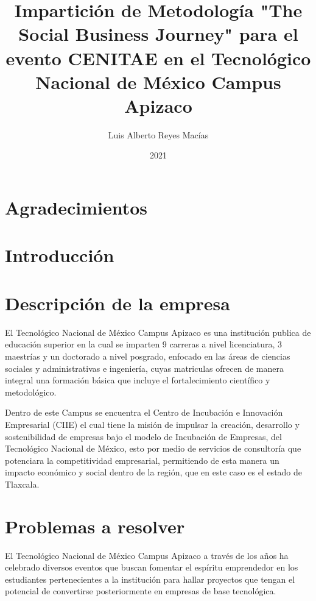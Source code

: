 \documentclass{memoir}
\title{Impartici\'on de Metodolog\'ia "The Social Business Journey" para el evento CENITAE en el Tecnol\'ogico Nacional de M\'exico Campus Apizaco}
\author{Luis Alberto Reyes Mac\'ias}
\date{2021}
\begin{document}
\maketitle

\chapter{Agradecimientos}

\clearpage

\begin{abstract}

\end{abstract}

\clearpage

\tableofcontents

\clearpage


\chapter{Introducción}
\label{sec:org3482cf4}


\chapter{Descripción de la empresa}
\label{sec:orgac75187}

El Tecnológico Nacional de México Campus Apizaco es una institución publica de educación superior en la cual se imparten 9 carreras a nivel licenciatura, 3 maestrías y un doctorado a nivel posgrado, enfocado en las áreas de ciencias sociales y administrativas e ingeniería, cuyas matriculas ofrecen de manera integral una formación básica que incluye el fortalecimiento científico y metodológico. 

Dentro de este Campus se encuentra el Centro de Incubación e Innovación Empresarial (CIIE) el cual tiene la misión de impulsar la creación, desarrollo y sostenibilidad de empresas bajo el modelo de Incubación de Empresas, del Tecnológico Nacional de México, esto por medio de servicios de consultoría que potenciara la competitividad empresarial, permitiendo de esta manera un impacto económico y social dentro de la región, que en este caso es el estado de Tlaxcala.

\chapter{Problemas a resolver}
\label{sec:orgc2cd703}

El Tecnológico Nacional de México Campus Apizaco a través de los años ha celebrado diversos eventos que buscan fomentar el espíritu emprendedor en los estudiantes pertenecientes a la institución para hallar proyectos que tengan el potencial de convertirse posteriormente en empresas de base tecnológica.
\end{document}
